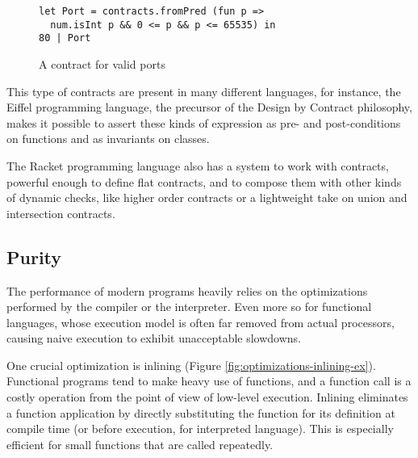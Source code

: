 \documentclass[sigplan,10pt,review,anonymous]{acmart}
\newcommand{\unsure}[2][1=]{}
\begin{document}
\begin{figure}[h]
  \begin{center}
\begin{lstlisting}[language=nickel]
let Port = contracts.fromPred (fun p =>
  num.isInt p && 0 <= p && p <= 65535) in
80 | Port
\end{lstlisting}
\end{center}
\caption{A contract for valid ports}
\label{fig:port-contract}
\end{figure}

This type of contracts are present in many different languages,
for instance, the Eiffel programming language\cite{meyer1987eiffel}, the precursor
of the Design by Contract philosophy, makes it possible to assert
these kinds of expression as pre- and post-conditions on
functions and as invariants on classes\cite{EiffelDesignByContract}.

The Racket programming language also has a system to work with
contracts, powerful enough to define flat contracts, and
to compose them with other kinds of dynamic checks,
like higher order contracts or a lightweight take on union
and intersection contracts\cite{RacketContracts}.


\subsection{Purity}
\label{sec:optimizations}

\unsure{I (Arnaud) changed the title of this subsection. Maybe it's
  not the best one, but if it is, then we ought to reorder the section
  a little bit to fit the modified narrative.}

The performance of modern programs heavily relies on the optimizations performed
by the compiler or the interpreter. Even more so for functional languages, whose
execution model is often far removed from actual processors, causing naive
execution to exhibit unacceptable slowdowns.

One crucial optimization is
inlining (Figure \ref{fig:optimizations-inlining-ex}). Functional programs tend
to make heavy use of functions, and a function call is a costly operation from
the point of view of low-level execution. Inlining eliminates a function
application by directly substituting the function for its definition at compile
time (or before execution, for interpreted language). This is especially
efficient for small functions that are called repeatedly.
\end{document}
